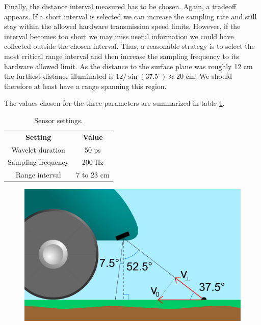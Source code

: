 Finally, the distance interval measured has to be chosen. Again, a tradeoff appears. If a short interval is selected we can increase the sampling rate and still stay within the allowed hardware transmission speed limits. However, if the interval becomes too short we may miss useful information we could have collected outside the chosen interval. Thus, a reasonable strategy is to select the most critical range interval and then increase the sampling frequency to its hardware allowed limit. As the distance to the surface plane was roughly 12 cm the furthest distance illuminated is $12/\sin(37.5^\circ)\approx 20$ cm. We should therefore at least have a range spanning this region.  

The values chosen for the three parameters are summarized in table \ref{tab:sensor_settings}. 

\begin{table}
\begin{center}
	\begin{tabular}{|c|c|}
	  	\hline
	  	\cellcolor{gray!150}\color{white}\textbf{Setting} & \cellcolor{gray!150}\color{white}\textbf{Value} \\
	 	 Wavelet duration & 50 ps \\
	  	\cellcolor{gray!25}Sampling frequency & \cellcolor{gray!25}200 Hz \\
	  	Range interval & 7 to 23 cm \\ 
		\hline
  	\end{tabular}	
\end{center}
\caption{Sensor settings.}
\label{tab:sensor_settings}
\end{table}



\begin{figure}[h]
	\centering
	\includegraphics[scale=0.30]{figs_temp/sensor_placement.jpg}
	\caption{}
	\label{fig:sensor_placement}
\end{figure}

